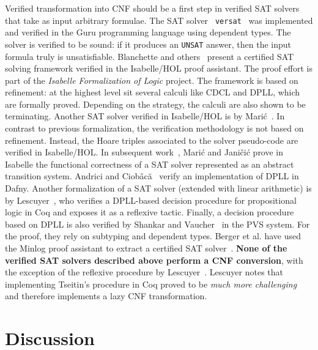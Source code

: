 \documentclass[12pt]{report}
\begin{document}
Verified transformation into CNF should be a first step in verified
SAT solvers that take as input arbitrary formulae. The SAT solver {\tt
  versat}~\cite{DBLP:conf/vmcai/OeSOC12} was implemented and verified
in the Guru programming language using dependent types. The solver is
verified to be sound: if it produces an {\tt UNSAT} answer, then the
input formula truly is unsatisfiable. Blanchette and
others~\cite{DBLP:journals/jar/BlanchetteFLW18} present a certified
SAT solving framework verified in the Isabelle/HOL proof
assistant. The proof effort is part of the \emph{Isabelle
  Formalization of Logic} project. The framework is based on
refinement: at the highest level sit several calculi like CDCL and
DPLL, which are formally proved. Depending on the strategy, the
calculi are also shown to be terminating. Another SAT solver verified
in Isabelle/HOL is by Mari\'{c}~\cite{DBLP:journals/jar/Maric09}. In
contrast to previous formalization, the verification methodology is
not based on refinement. Instead, the Hoare triples associated to the
solver pseudo-code are verified in Isabelle/HOL. In subsequent
work~\cite{DBLP:journals/corr/abs-1108-4368}, Mari{\'c} and Janičić
prove in Isabelle the functional correctness of a SAT solver
represented as an abstract transition system. Andrici and
Ciobâcă~\cite{DBLP:journals/corr/abs-2007-10842,DBLP:journals/corr/abs-1909-01743}
verify an implementation of DPLL in Dafny. Another formalization of a
SAT solver (extended with linear arithmetic) is by
Lescuyer~\cite{lescuyer:tel-00713668}, who verifies a DPLL-based
decision procedure for propositional logic in Coq and exposes it as a
reflexive tactic. Finally, a decision procedure based on DPLL is also
verified by Shankar and Vaucher~\cite{DBLP:journals/entcs/ShankarV11}
in the PVS system. For the proof, they rely on subtyping and dependent
types. Berger et al. have used the Minlog proof assistant to extract a
certified SAT solver~\cite{DBLP:journals/corr/BergerLFS15}.  {\bf None
  of the verified SAT solvers described above perform a CNF
  conversion}, with the exception of the reflexive procedure by
Lescuyer~\cite{lescuyer:tel-00713668}. Lescuyer notes that
implementing Tseitin's procedure in Coq proved to be \emph{much more
  challenging} and therefore implements a lazy CNF transformation.

\section{Discussion}
\label{sec:conclusion}
\end{document}
